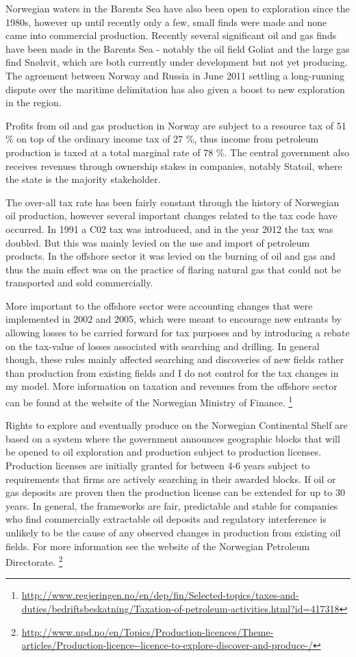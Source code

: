 \documentclass[12pt]{article}
\begin{document}
Norwegian waters in the Barents Sea have also been open to exploration since the 1980s, however up until recently only a few, small finds were made and none came into commercial production.  Recently several significant oil and gas finds have been made in the Barents Sea - notably the oil field Goliat and the large gas find Sn\o hvit, which are both currently under development but not yet producing.  The agreement between Norway and Russia in June 2011 settling a long-running dispute over the maritime delimitation has also given a boost to new exploration in the region.  

Profits from oil and gas production in Norway are subject to a resource tax of 51 \% on top of the ordinary income tax of 27 \%, thus income from petroleum production is taxed at a total marginal rate of 78 \%.  The central government also receives revenues through ownership stakes in companies, notably Statoil, where the state is the majority stakeholder. 

The over-all tax rate has been fairly constant through the history of Norwegian oil production, however several important changes related to the tax code have occurred.  In 1991 a C02 tax was introduced, and in the year 2012 the tax was doubled.  But this was mainly levied on the use and import of petroleum products.  In the offshore sector it was levied on the burning of oil and gas and thus the main effect was on the practice of flaring natural gas that could not be transported and sold commercially.

More important to the offshore sector were accounting changes that were implemented in 2002 and 2005, which were meant to encourage new entrants by allowing losses to be carried forward for tax purposes and by introducing a rebate on the tax-value of losses associated with searching and drilling.  In general though, these rules mainly affected searching and discoveries of new fields rather than production from existing fields and I do not control for the tax changes in my model.  More information on taxation and revenues from the offshore sector can be found at the website of the Norwegian Ministry of Finance. \footnote{\url{http://www.regjeringen.no/en/dep/fin/Selected-topics/taxes-and-duties/bedriftsbeskatning/Taxation-of-petroleum-activities.html?id=417318}}

Rights to explore and eventually produce on the Norwegian Continental Shelf are based on a system where the government announces geographic blocks that will be opened to oil exploration and production subject to production licenses.  Production licenses are initially granted for between 4-6 years subject to requirements that firms are actively searching in their awarded blocks.  If oil or gas deposits are proven then the production license can be extended for up to 30 years.  In general, the frameworks are fair, predictable and stable for companies who find commercially extractable oil deposits and regulatory interference is unlikely to be the cause of any observed changes in production from existing oil fields.  For more information see the website of the Norwegian Petroleum Directorate. \footnote{\url{http://www.npd.no/en/Topics/Production-licences/Theme-articles/Production-licence--licence-to-explore-discover-and-produce-/}}
\end{document}

